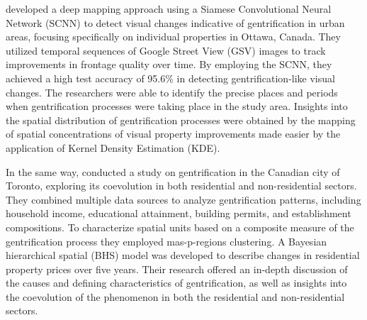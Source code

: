   developed a deep mapping approach using a Siamese Convolutional Neural Network (SCNN) to detect visual changes indicative of gentrification in urban areas, focusing specifically on individual properties in Ottawa, Canada. They utilized temporal sequences of Google Street View (GSV) images to track improvements in frontage quality over time. By employing the SCNN, they achieved a high test accuracy of 95.6\% in detecting gentrification-like visual changes. The researchers were able to identify the precise places and periods when gentrification processes were taking place in the study area. Insights into the spatial distribution of gentrification processes were obtained by the mapping of spatial concentrations of visual property improvements made easier by the application of Kernel Density Estimation (KDE). 

 In the same way,  conducted a study on gentrification in the Canadian city of Toronto, exploring its coevolution in both residential and non-residential sectors. They combined multiple data sources to analyze gentrification patterns, including household income, educational attainment, building permits, and establishment compositions. To characterize spatial units based on a composite measure of the gentrification process they employed mas-p-regions clustering. A Bayesian hierarchical spatial (BHS) model was developed to describe changes in residential property prices over five years. Their research offered an in-depth discussion of the causes and defining characteristics of gentrification, as well as insights into the coevolution of the phenomenon in both the residential and non-residential sectors.

 

